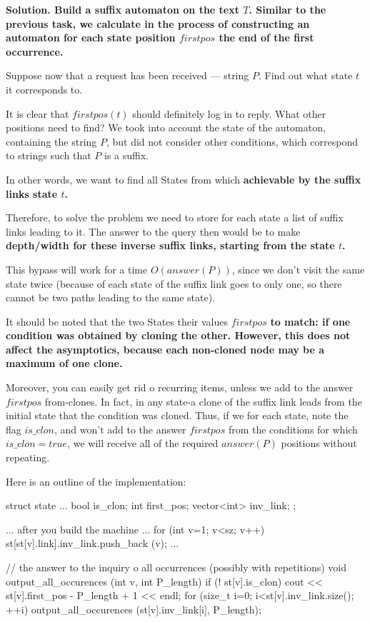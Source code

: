 \bf{Solution}. Build a suffix automaton on the text $T$. Similar to the previous task, we calculate in the process of constructing an automaton for each state position $firstpos$ the end of the first occurrence.

Suppose now that a request has been received --- string $P$. Find out what state $t$ it corresponds to.

It is clear that $firstpos(t)$ should definitely log in to reply. What other positions need to find? We took into account the state of the automaton, containing the string $P$, but did not consider other conditions, which correspond to strings such that $P$ is a suffix.

In other words, we want to find all States from which \bf{achievable by the suffix links} state $t$.

Therefore, to solve the problem we need to store for each state a list of suffix links leading to it. The answer to the query then would be to make \bf{depth/width} for these inverse suffix links, starting from the state $t$.

This bypass will work for a time $O (answer (P))$, since we don't visit the same state twice (because of each state of the suffix link goes to only one, so there cannot be two paths leading to the same state).

It should be noted that the two States their values $firstpos$ \bf{to match}: if one condition was obtained by cloning the other. However, this does not affect the asymptotics, because each non-cloned node may be a maximum of one clone.

Moreover, you can easily get rid o recurring items, unless we add to the answer $firstpos$ from-clones. In fact, in any state-a clone of the suffix link leads from the initial state that the condition was cloned. Thus, if we for each state, note the flag $is\_clon$, and won't add to the answer $firstpos$ from the conditions for which $is\_clon = true$, we will receive all of the required $answer (P)$ positions without repeating.

Here is an outline of the implementation:

\code
struct state {
...
bool is_clon;
int first_pos;
vector<int> inv_link;
};


... after you build the machine ...
for (int v=1; v<sz; v++)
st[st[v].link].inv_link.push_back (v);
...


// the answer to the inquiry o all occurrences (possibly with repetitions)
void output_all_occurences (int v, int P_length) {
if (! st[v].is_clon)
cout << st[v].first_pos - P_length + 1 << endl;
for (size_t i=0; i<st[v].inv_link.size(); ++i)
output_all_occurences (st[v].inv_link[i], P_length);
}
\endcode


